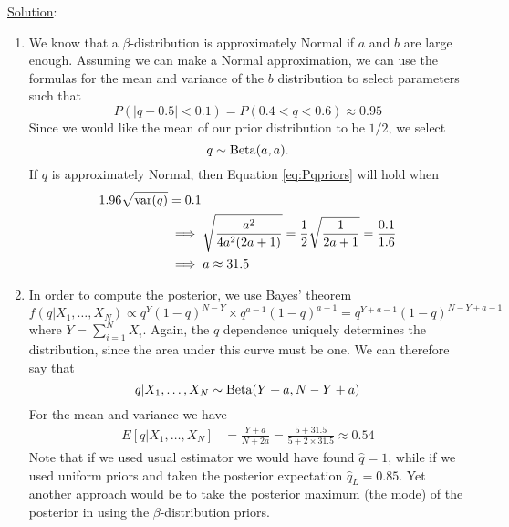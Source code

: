 \begin{itemize}
\begin{example}
\noindent 
\underline{Solution}: 
\begin{enumerate}[label=(\alph*)]
\item We know that a $\beta$-distribution is approximately Normal if $a$ and $b$ are large enough. Assuming we can make a Normal approximation, we can use the formulas for the mean and variance of the $b$ distribution to select parameters such that 
\begin{equation}\label{eq:Pqpriors}
P(|q-0.5|<0.1)  = P(0.4<q<0.6) \approx 0.95
\end{equation}
Since we would like the mean of our prior distribution to be $1/2$, we select
\begin{equation*}
q \sim {\rm Beta}(a,a).
\end{equation*}
If $q$ is approximately Normal, then Equation \ref{eq:Pqpriors} will hold when 
\begin{align*}
1.96 \sqrt{{\rm var}(q)} &= 0.1 \\
&\implies  \sqrt{\frac{a^2}{4a^2(2a+1)}} = \frac{1}{2}\sqrt{\frac{1}{2a+1}}= \frac{0.1}{1.6}\\
&\implies a \approx 31.5
\end{align*}
\item In order to compute the posterior, we use Bayes' theorem 
\begin{equation*}
f(q|X_1,\dots,X_N) \propto q^{Y}(1-q)^{N-Y} \times q^{a-1}(1-q)^{a-1} = q^{Y+a-1}(1-q)^{N-Y+a-1}
\end{equation*}
where $Y = \sum_{i=1}^NX_i$. 
Again, the $q$ dependence uniquely determines the distribution, since the area under this curve must be one. We can therefore say that 
\begin{equation*}
q|X_1,\dots,X_N \sim {\rm Beta}(Y+a,N-Y+a)
\end{equation*}
For the mean and variance we have
\begin{align*}
E[q|X_1,\dots,X_N] &= \frac{Y+a}{N+2a} =  \frac{5+31.5}{5+2\times 31.5}  \approx 0.54
\end{align*}
Note that if we used usual estimator we would have found $\hat{q} = 1$, while if we used uniform priors and taken the posterior expectation $\hat{q}_L = 0.85$. Yet another approach would be to take the posterior maximum (the mode) of the posterior in using the $\beta$-distribution priors. 

\end{enumerate}

\end{example}


\end{itemize}
